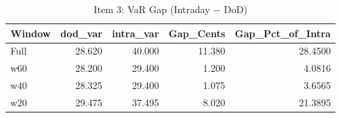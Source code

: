 \begin{table}

\caption{\label{tab:export_latex_tables}Item 3: VaR Gap (Intraday − DoD)}
\centering
\begin{tabular}[t]{lrrrr}
\toprule
Window & dod\_var & intra\_var & Gap\_Cents & Gap\_Pct\_of\_Intra\\
\midrule
Full & 28.620 & 40.000 & 11.380 & 28.4500\\
w60 & 28.200 & 29.400 & 1.200 & 4.0816\\
w40 & 28.325 & 29.400 & 1.075 & 3.6565\\
w20 & 29.475 & 37.495 & 8.020 & 21.3895\\
\bottomrule
\end{tabular}
\end{table}
